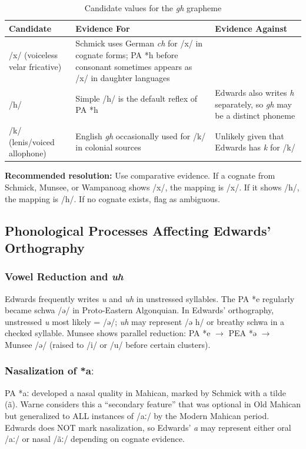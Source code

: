 \begin{table}[h]
\centering
\begin{tabular}{lll}
\toprule
\textbf{Candidate} & \textbf{Evidence For} & \textbf{Evidence Against} \\
\midrule
/x/ (voiceless velar fricative) & Schmick uses German \textit{ch} for /x/ in cognate forms; PA *h before consonant sometimes appears as /x/ in daughter languages & \\
/h/ & Simple /h/ is the default reflex of PA *h & Edwards also writes \textit{h} separately, so \textit{gh} may be a distinct phoneme \\
/k/ (lenis/voiced allophone) & English \textit{gh} occasionally used for /k/ in colonial sources & Unlikely given that Edwards has \textit{k} for /k/ \\
\bottomrule
\end{tabular}
\caption{Candidate values for the \textit{gh} grapheme}
\label{tab:1369-gh}
\end{table}

\textbf{Recommended resolution:} Use comparative evidence. If a cognate from
Schmick, Munsee, or Wampanoag shows /x/, the mapping is /x/. If it shows /h/,
the mapping is /h/. If no cognate exists, flag as ambiguous.

\subsection{Phonological Processes Affecting Edwards' Orthography}

\subsubsection{Vowel Reduction and \textit{uh}}

Edwards frequently writes \textit{u} and \textit{uh} in unstressed syllables.
The PA *e regularly became schwa /ə/ in Proto-Eastern Algonquian. In
Edwards' orthography, unstressed \textit{u} most likely = /ə/;
\textit{uh} may represent /ə h/ or breathy schwa in a checked syllable.
Munsee shows parallel reduction: PA *e $\rightarrow$ PEA *ə
$\rightarrow$ Munsee /ə/ (raised to /i/ or /u/ before certain clusters).

\subsubsection{Nasalization of *aː}

PA *aː developed a nasal quality in Mahican, marked by Schmick with a tilde
(ã). Warne considers this a ``secondary feature'' that was optional in Old
Mahican but generalized to ALL instances of /aː/ by the Modern Mahican
period. Edwards does NOT mark nasalization, so Edwards' \textit{a} may
represent either oral /aː/ or nasal /ãː/ depending on cognate evidence.


